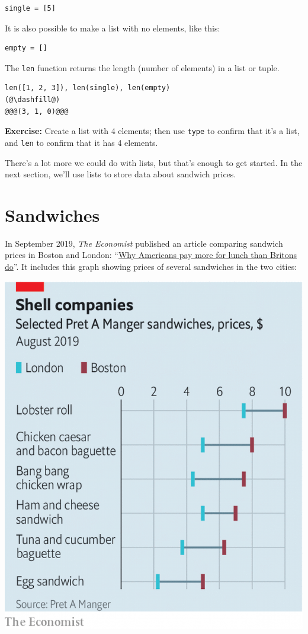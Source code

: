 \begin{lstlisting}[]
single = [5]
\end{lstlisting}

It is also possible to make a list with no elements, like this:

\begin{lstlisting}[]
empty = []
\end{lstlisting}

The \passthrough{\lstinline!len!} function returns the length (number of
elements) in a list or tuple.

\begin{lstlisting}[]
len([1, 2, 3]), len(single), len(empty)
(@\dashfill@)
@@@(3, 1, 0)@@@
\end{lstlisting}

\textbf{Exercise:} Create a list with 4 elements; then use
\passthrough{\lstinline!type!} to confirm that it's a list, and
\passthrough{\lstinline!len!} to confirm that it has 4 elements.

There's a lot more we could do with lists, but that's enough to get
started. In the next section, we'll use lists to store data about
sandwich prices.

\hypertarget{sandwiches}{%
\section{Sandwiches}\label{sandwiches}}

In September 2019, \emph{The Economist} published an article comparing
sandwich prices in Boston and London:
``\href{https://www.economist.com/finance-and-economics/2019/09/07/why-americans-pay-more-for-lunch-than-britons-do}{Why
Americans pay more for lunch than Britons do}''. It includes this graph
showing prices of several sandwiches in the two cities:

\includegraphics{figs/20190907_FNC941.png}

